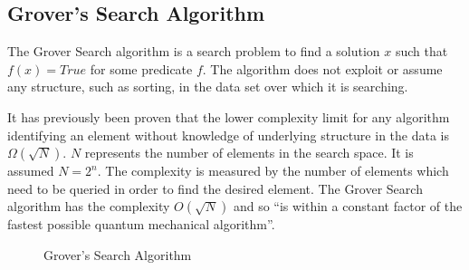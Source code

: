 \subsection{Grover's Search Algorithm}	
\label{sec:grovers}
The Grover Search algorithm\cite{Grover:1996rk} is a search problem to find a solution $x$ such that $f(x)=True$ for some predicate $f$.
The algorithm does not exploit or assume any structure, such as sorting, in the data set over which it is searching.

It has previously been proven\cite{Bennett:1996iu} that the lower complexity limit for any algorithm identifying an element without knowledge of underlying structure in the data is $\Omega(\sqrt{N})$.
$N$ represents the number of elements in the search space.
It is assumed $N=2^n$.
The complexity is measured by the number of elements which need to be queried in order to find the desired element.
The Grover Search algorithm has the complexity $O(\sqrt{N})$ and so ``is within a constant factor of the fastest possible quantum mechanical algorithm''\cite{Grover:1996rk}.

\begin{figure}
\begin{center}

\hspace{20pt}
 
\end{center}
\caption{Grover's Search Algorithm}
\end{figure}


